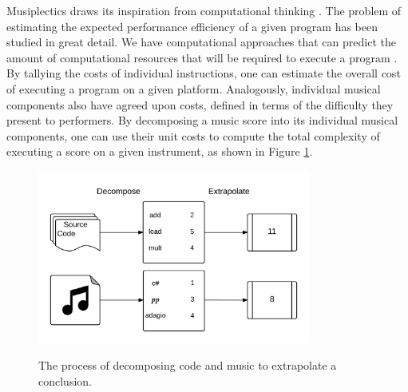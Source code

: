 \documentclass[12pt]{report}
\begin{document}
Musiplectics draws its inspiration from computational thinking \cite{wing2006computational}. The problem of estimating the expected performance efficiency of a given program has been studied in great detail. We have computational approaches that can predict the amount of computational resources that will be required to execute a program \cite{Park1993} \cite{Tiwari1996}. By tallying the costs of individual instructions, one can estimate the overall cost of executing a program on a given platform. Analogously, individual musical components also have agreed upon costs, defined in terms of the difficulty they present to performers. By decomposing a music score into its individual musical components, one can use their unit costs to compute the total complexity of executing a score on a given instrument, as shown in Figure \ref{image:analogy}.



\begin{figure}[ht!]
	\centering
		\caption{The process of decomposing code and music to extrapolate a conclusion.}	\includegraphics[width=0.8\textwidth,natwidth=1650,natheight=1050]{ComputationalThinkingAnalogy.png}
		\label{image:analogy}
\end{figure} 
\end{document}
